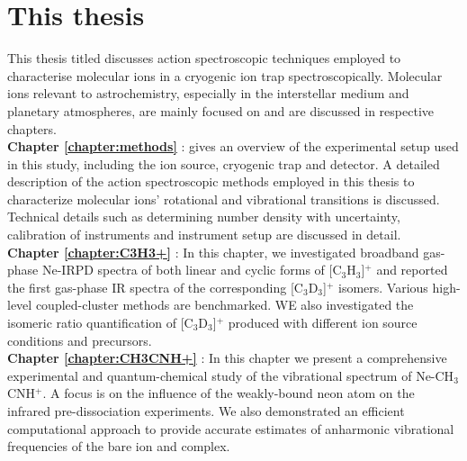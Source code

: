 \section{This thesis}

This thesis titled  discusses action spectroscopic techniques employed to characterise molecular ions in a cryogenic ion trap spectroscopically. Molecular ions relevant to astrochemistry, especially in the interstellar medium and planetary atmospheres, are mainly focused on and are discussed in respective chapters.\\

\textbf{Chapter \ref{chapter:methods}} \emph{}:  gives an overview of the experimental setup used in this study, including the ion source, cryogenic trap and detector. A detailed description of the action spectroscopic methods employed in this thesis to characterize molecular ions' rotational and vibrational transitions is discussed. Technical details such as determining number density with uncertainty, calibration of instruments and instrument setup are discussed in detail.\\

\textbf{Chapter \ref{chapter:C3H3+}} \emph{}: In this chapter, we investigated broadband gas-phase Ne-IRPD spectra of both linear and cyclic forms of [C$_3$H$_3$]$^+$ and reported the first gas-phase IR spectra of the corresponding [C$_3$D$_3$]$^+$ isomers. Various high-level coupled-cluster methods are benchmarked. WE also investigated the isomeric ratio quantification of [C$_3$D$_3$]$^+$ produced with different ion source conditions and precursors.\\

\textbf{Chapter \ref{chapter:CH3CNH+}} \emph{}: In this chapter we present a comprehensive experimental and quantum-chemical study of the vibrational spectrum of Ne-CH$_3$CNH$^+$. A focus is on the influence of the weakly-bound neon atom on the infrared pre-dissociation experiments. We also demonstrated an efficient computational approach to provide accurate estimates of anharmonic 
 vibrational frequencies of the bare ion and complex.\\


